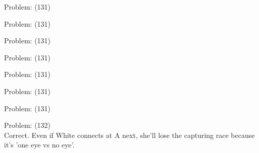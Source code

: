 \documentclass[11pt]{article}
\begin{document}
\begin{minipage}[t]{0.5\textwidth}
  {\centering
  
Problem: (131)\\
  }
\end{minipage}
\begin{minipage}[t]{0.5\textwidth}
  {\centering
  
Problem: (131)\\
  }
\end{minipage}
\begin{minipage}[t]{0.5\textwidth}
  {\centering
  
Problem: (131)\\
  }
\end{minipage}
\begin{minipage}[t]{0.5\textwidth}
  {\centering
  
Problem: (131)\\
  }
\end{minipage}
\begin{minipage}[t]{0.5\textwidth}
  {\centering
  
Problem: (131)\\
  }
\end{minipage}
\begin{minipage}[t]{0.5\textwidth}
  {\centering
  
Problem: (131)\\
  }
\end{minipage}
\begin{minipage}[t]{0.5\textwidth}
  {\centering
  
Problem: (131)\\
  }
\end{minipage}
\begin{minipage}[t]{0.5\textwidth}
  {\centering
  
Problem: (132)\\
Correct. Even if White connects at A next, she'll lose the capturing race because it's 'one eye vs no eye'.\\
  }
\end{minipage}
\end{document}
